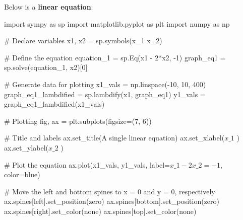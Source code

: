 \documentclass[
  letterpaper,
  DIV=11,
  numbers=noendperiod]{scrreprt}
\newenvironment{Shaded}{\begin{snugshade}}{\end{snugshade}}
\newcommand{\CommentTok}[1]{\textcolor[rgb]{0.37,0.37,0.37}{#1}}
\newcommand{\DecValTok}[1]{\textcolor[rgb]{0.68,0.00,0.00}{#1}}
\newcommand{\ImportTok}[1]{\textcolor[rgb]{0.00,0.46,0.62}{#1}}
\newcommand{\NormalTok}[1]{\textcolor[rgb]{0.00,0.23,0.31}{#1}}
\newcommand{\OperatorTok}[1]{\textcolor[rgb]{0.37,0.37,0.37}{#1}}
\newcommand{\StringTok}[1]{\textcolor[rgb]{0.13,0.47,0.30}{#1}}
\begin{document}
Below is a \textbf{linear equation}:

\begin{Shaded}
\begin{Highlighting}[]
\ImportTok{import}\NormalTok{ sympy }\ImportTok{as}\NormalTok{ sp}
\ImportTok{import}\NormalTok{ matplotlib.pyplot }\ImportTok{as}\NormalTok{ plt}
\ImportTok{import}\NormalTok{ numpy }\ImportTok{as}\NormalTok{ np}

\CommentTok{\# Declare variables}
\NormalTok{x1, x2 }\OperatorTok{=}\NormalTok{ sp.symbols(}\StringTok{\textquotesingle{}x\_1 x\_2\textquotesingle{}}\NormalTok{)}

\CommentTok{\# Define the equation}
\NormalTok{equation\_1 }\OperatorTok{=}\NormalTok{ sp.Eq(x1 }\OperatorTok{{-}} \DecValTok{2}\OperatorTok{*}\NormalTok{x2, }\OperatorTok{{-}}\DecValTok{1}\NormalTok{)}
\NormalTok{graph\_eq1 }\OperatorTok{=}\NormalTok{ sp.solve(equation\_1, x2)[}\DecValTok{0}\NormalTok{]}

\CommentTok{\# Generate data for plotting}
\NormalTok{x1\_vals }\OperatorTok{=}\NormalTok{ np.linspace(}\OperatorTok{{-}}\DecValTok{10}\NormalTok{, }\DecValTok{10}\NormalTok{, }\DecValTok{400}\NormalTok{)}
\NormalTok{graph\_eq1\_lambdified }\OperatorTok{=}\NormalTok{ sp.lambdify(x1, graph\_eq1)}
\NormalTok{y1\_vals }\OperatorTok{=}\NormalTok{ graph\_eq1\_lambdified(x1\_vals)}

\CommentTok{\# Plotting}
\NormalTok{fig, ax }\OperatorTok{=}\NormalTok{ plt.subplots(figsize}\OperatorTok{=}\NormalTok{(}\DecValTok{7}\NormalTok{, }\DecValTok{6}\NormalTok{))}

\CommentTok{\# Title and labels}
\NormalTok{ax.set\_title(}\StringTok{\textquotesingle{}A single linear equation\textquotesingle{}}\NormalTok{)}
\NormalTok{ax.set\_xlabel(}\StringTok{\textquotesingle{}$x\_1$                                                                                                                            \textquotesingle{}}\NormalTok{)}
\NormalTok{ax.set\_ylabel(}\StringTok{\textquotesingle{}$x\_2$                                                                                                    \textquotesingle{}}\NormalTok{)}

\CommentTok{\# Plot the equation}
\NormalTok{ax.plot(x1\_vals, y1\_vals, label}\OperatorTok{=}\StringTok{\textquotesingle{}$x\_1 {-} 2x\_2 = {-}1$\textquotesingle{}}\NormalTok{, color}\OperatorTok{=}\StringTok{\textquotesingle{}blue\textquotesingle{}}\NormalTok{)}

\CommentTok{\# Move the left and bottom spines to x = 0 and y = 0, respectively}
\NormalTok{ax.spines[}\StringTok{\textquotesingle{}left\textquotesingle{}}\NormalTok{].set\_position(}\StringTok{\textquotesingle{}zero\textquotesingle{}}\NormalTok{)}
\NormalTok{ax.spines[}\StringTok{\textquotesingle{}bottom\textquotesingle{}}\NormalTok{].set\_position(}\StringTok{\textquotesingle{}zero\textquotesingle{}}\NormalTok{)}
\NormalTok{ax.spines[}\StringTok{\textquotesingle{}right\textquotesingle{}}\NormalTok{].set\_color(}\StringTok{\textquotesingle{}none\textquotesingle{}}\NormalTok{)}
\NormalTok{ax.spines[}\StringTok{\textquotesingle{}top\textquotesingle{}}\NormalTok{].set\_color(}\StringTok{\textquotesingle{}none\textquotesingle{}}\NormalTok{)}


\end{Highlighting}
\end{Shaded}
\end{document}
